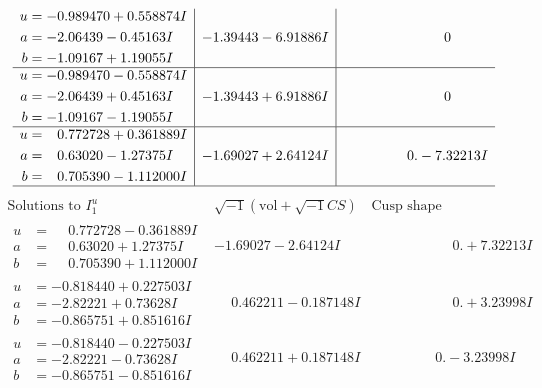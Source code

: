 \documentclass[1p]{elsarticle_modified}
\theoremstyle{definition}
\newcommand{\I}{\sqrt{-1}}
\begin{document}
$$\begin{array}{c|c|c}
\begin{aligned}
u &= -0.989470 + 0.558874 I \\
a &= -2.06439 - 0.45163 I \\
b &= -1.09167 + 1.19055 I\end{aligned}
 & -1.39443 - 6.91886 I & \phantom{-0.000000 } 0 \\ \hline\begin{aligned}
u &= -0.989470 - 0.558874 I \\
a &= -2.06439 + 0.45163 I \\
b &= -1.09167 - 1.19055 I\end{aligned}
 & -1.39443 + 6.91886 I & \phantom{-0.000000 } 0 \\ \hline\begin{aligned}
u &= \phantom{-}0.772728 + 0.361889 I \\
a &= \phantom{-}0.63020 - 1.27375 I \\
b &= \phantom{-}0.705390 - 1.112000 I\end{aligned}
 & -1.69027 + 2.64124 I & \phantom{-0.000000 } 0. - 7.32213 I\\
 \hline 
 \end{array}$$\newpage$$\begin{array}{c|c|c}  
\text{Solutions to }I^u_{1}& \I (\text{vol} + \sqrt{-1}CS) & \text{Cusp shape}\\
 \hline 
\begin{aligned}
u &= \phantom{-}0.772728 - 0.361889 I \\
a &= \phantom{-}0.63020 + 1.27375 I \\
b &= \phantom{-}0.705390 + 1.112000 I\end{aligned}
 & -1.69027 - 2.64124 I & \phantom{-0.000000 -}0. + 7.32213 I \\ \hline\begin{aligned}
u &= -0.818440 + 0.227503 I \\
a &= -2.82221 + 0.73628 I \\
b &= -0.865751 + 0.851616 I\end{aligned}
 & \phantom{-}0.462211 - 0.187148 I & \phantom{-0.000000 -}0. + 3.23998 I \\ \hline\begin{aligned}
u &= -0.818440 - 0.227503 I \\
a &= -2.82221 - 0.73628 I \\
b &= -0.865751 - 0.851616 I\end{aligned}
 & \phantom{-}0.462211 + 0.187148 I & \phantom{-0.000000 } 0. - 3.23998 I \\ \hline\begin{aligned}

\end{aligned}
\end{array}$$
\end{document}
